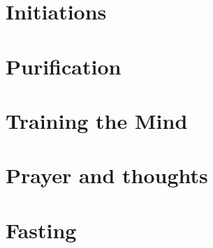 \documentclass[a4paper,12pt,twoside]{book}
\begin{document}
\chapter{Initiations}















\chapter{Purification}











\chapter{Training the Mind}









\chapter{Prayer and thoughts}






\chapter{Fasting}

\end{document}
